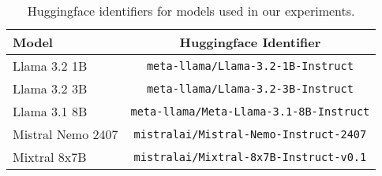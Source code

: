 \begin{table}[t]
    \def\arraystretch{1.1}
    \centering
    \scriptsize
    \begin{tabular}{l|c}
    \toprule
    Model & Huggingface Identifier \\
    \midrule
       Llama 3.2 1B  & \texttt{meta-llama/Llama-3.2-1B-Instruct} \\
        Llama 3.2 3B & \texttt{meta-llama/Llama-3.2-3B-Instruct} \\
         Llama 3.1 8B & \texttt{meta-llama/Meta-Llama-3.1-8B-Instruct} \\ 
          Mistral Nemo 2407 & \texttt{mistralai/Mistral-Nemo-Instruct-2407} \\
          Mixtral 8x7B & \texttt{mistralai/Mixtral-8x7B-Instruct-v0.1} \\
          \bottomrule
    \end{tabular}
    \caption{Huggingface identifiers for models used in our experiments.}
    \label{tab:models_description}
\end{table}